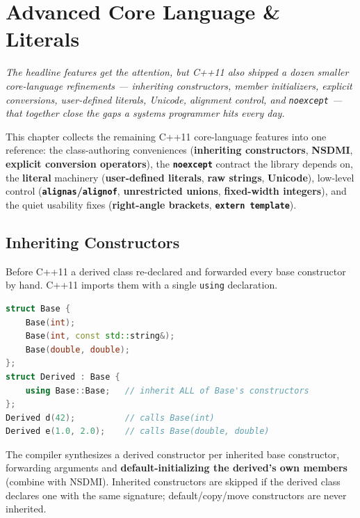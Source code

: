 \chapter{Advanced Core Language \& Literals}
\label{ch:advanced-core-language-and-literals}

\textit{The headline features get the attention, but C++11 also shipped a dozen smaller core-language refinements --- inheriting constructors, member initializers, explicit conversions, user-defined literals, Unicode, alignment control, and \texttt{noexcept} --- that together close the gaps a systems programmer hits every day.}

This chapter collects the remaining C++11 core-language features into one reference: the class-authoring conveniences (\textbf{inheriting constructors}, \textbf{NSDMI}, \textbf{explicit conversion operators}), the \textbf{\texttt{noexcept}} contract the library depends on, the \textbf{literal} machinery (\textbf{user-defined literals}, \textbf{raw strings}, \textbf{Unicode}), low-level control (\textbf{\texttt{alignas}/\texttt{alignof}}, \textbf{unrestricted unions}, \textbf{fixed-width integers}), and the quiet usability fixes (\textbf{right-angle brackets}, \textbf{\texttt{extern template}}).

\section{Inheriting Constructors}

Before C++11 a derived class re-declared and forwarded every base constructor by hand. C++11 imports them with a single \texttt{using} declaration.

\begin{lstlisting}[language=C++, caption={using Base::Base imports the base's constructors}]
struct Base {
    Base(int);
    Base(int, const std::string&);
    Base(double, double);
};
struct Derived : Base {
    using Base::Base;   // inherit ALL of Base's constructors
};
Derived d(42);          // calls Base(int)
Derived e(1.0, 2.0);    // calls Base(double, double)
\end{lstlisting}

The compiler synthesizes a derived constructor per inherited base constructor, forwarding arguments and \textbf{default-initializing the derived's own members} (combine with NSDMI). Inherited constructors are skipped if the derived class declares one with the same signature; default/copy/move constructors are never inherited.

